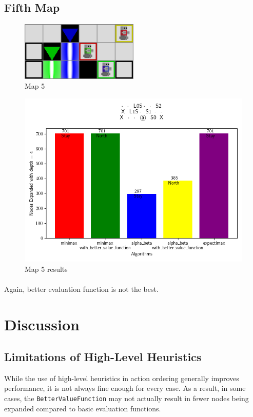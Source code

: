 \documentclass{article}
\begin{document}
\subsection{Fifth Map}
\begin{figure}
    \centering
    \includegraphics[width=0.5\textwidth]{media/map/map2023_10_29_13_55_47.png}
    \caption{Map 5}
    \label{fig:image5}
\end{figure}
\begin{figure}[h]
    \centering
    \includegraphics[width=\textwidth]{media/map2023_10_29_13_55_47.png}
    \caption{Map 5 results}
    \label{fig:image5}
\end{figure}
\vspace{1em}

\paragraph{}
Again, better evaluation function is not the best.

\newpage
\section{Discussion}
\subsection{Limitations of High-Level Heuristics}
While the use of high-level heuristics in action ordering 
generally improves performance, 
it is not always fine enough for every case.
As a result, in some cases, the \texttt{BetterValueFunction} 
may not actually result in fewer nodes being expanded 
compared to basic evaluation functions.
\end{document}
